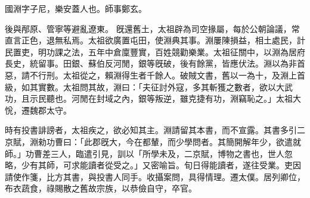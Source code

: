 \begin{pinyinscope}
 
 
 國淵字子尼，樂安蓋人也。師事鄭玄。
 
 
 後與邴原、管寧等避亂遼東。
 旣還舊土，太祖辟為司空掾屬，每於公朝論議，常直言正色，退無私焉。太祖欲廣置屯田，使淵典其事。淵屢陳損益，相土處民，計民置吏，明功課之法，五年中倉廩豐實，百姓競勸樂業。太祖征關中，以淵為居府長史，統留事。田銀、蘇伯反河閒，銀等旣破，後有餘黨，皆應伏法。淵以為非首惡，請不行刑。太祖從之，賴淵得生者千餘人。破賊文書，舊以一為十，及淵上首級，如其實數。太祖問其故，淵曰：「夫征討外寇，多其斬獲之數者，欲以大武功，且示民聽也。河閒在封域之內，銀等叛逆，雖克捷有功，淵竊恥之。」太祖大恱，遷魏郡太守。
 
 
時有投書誹謗者，太祖疾之，欲必知其主。淵請留其本書，而不宣露。其書多引二京賦，淵勑功曹曰：「此郡旣大，今在都輦，而少學問者。其簡開解年少，欲遣就師。」功曹差三人，臨遣引見，訓以「所學未及，二京賦，博物之書也，世人忽略，少有其師，可求能讀者從受之。」又密喻旨。旬日得能讀者，遂往受業。吏因請使作箋，比方其書，與投書人同手。收攝案問，具得情理。遷太僕。居列卿位，布衣蔬食，祿賜散之舊故宗族，以恭儉自守，卒官。
 
 
\end{pinyinscope}
